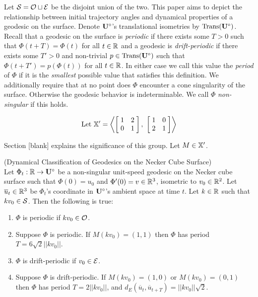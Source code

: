 \documentclass[]{article}
\def\<{\langle} \def\>{\rangle}
\begin{document}
\noindent Let $\mathcal{S}=\mathcal{O}\sqcup\mathcal{E}$ be the disjoint union of the two. This paper aims to depict the relationship between initial trajectory angles and dynamical properties of a geodesic on the surface. Denote $\mathbf{U}^\circ$'s translational isometries by $\text{Trans}(\mathbf{U}^\circ)$. Recall that a geodesic on the surface is \emph{periodic} if there exists some $T>0$ such that $\Phi(t+T)=\Phi(t)$ for all $t\in\mathbb{R}$ and a geodesic is \emph{drift-periodic} if there exists some $T'>0$ and non-trivial $p\in \text{Trans}(\mathbf{U}^\circ)$ such that $\Phi(t+T')=p(\Phi(t))$ for all $t\in\mathbb{R}$. In either case we call this value the \emph{period} of $\Phi$ if it is the \emph{smallest} possible value that satisfies this definition. We additionally require that at no point does $\Phi$ encounter a cone singularity of the surface. Otherwise the geodesic behavior is indeterminable. We call $\Phi$ \emph{non-singular} if this holds. 

\begin{align}
\text{Let }\XX'=\left\< \left[ \hspace{1mm} \begin{matrix}
							1 & 2\\
							 0 & 1
						\end{matrix}\hspace{1mm}\right],~
\left[ \hspace{1mm} \begin{matrix}
							1 & 0\\
							 2 & 1
						\end{matrix}\hspace{1mm}\right]\right\>
\end{align}

\noindent Section [blank] explains the significance of this group. Let $M\in\mathbb{X}'$.


\begin{thm*}
(Dynamical Classification of Geodesics on the Necker Cube Surface) \\Let $\Phi_t:\mathbb{R}\rightarrow\mathbf{U}^\circ$ be a non-singular unit-speed geodesic on the Necker cube surface such that $\Phi(0)=u_0$ and $\Phi'(0)=v\in\mathbb{R}^3$, isometric to $v_0\in\mathbb{R}^2$. Let $\overline{u}_t\in\mathbb{R}^3$ be $\Phi_t$'s coordinate in $\mathbf{U}^\circ$'s ambient space at time $t$. Let $k\in\mathbb{R}$ such that $kv_0\in\mathcal{S}$. Then the following is true:
\begin{enumerate}[label=(\roman*)]
\item $\Phi$ is periodic if $kv_0\in\mathcal{O}$.
\item Suppose $\Phi$ is periodic. If $M (kv_0)=(1,1)$ then $\Phi$ has period $T=6\sqrt{2}||kv_0||$.
\item $\Phi$ is drift-periodic if $v_0\in\mathcal{E}$. 
\item Suppose $\Phi$ is drift-periodic. If $M (kv_0)=(1,0)$ or $M (kv_0)=(0,1)$ then $\Phi$ has period $T=2||kv_0||$, and $d_E(\overline{u}_t,\overline{u}_{t+T})=||kv_0||\sqrt{2}$.
\end{enumerate}
\end{thm*}
\end{document}
